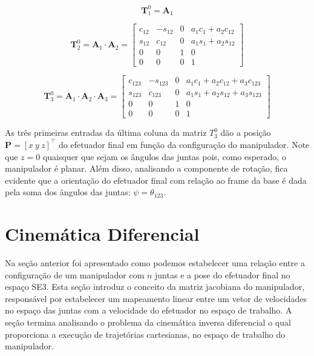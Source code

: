 \begin{equation}
    \mathbf{T}^0_1 = \mathbf{A}_1
\end{equation}

\begin{equation}
    \mathbf{T}^0_2 = \mathbf{A}_1 \cdot \mathbf{A}_2 = \begin{bmatrix}
        c_{12} & -s_{12} & 0 & a_1c_1 + a_2c_{12} \\
        s_{12} & c_{12}  & 0 & a_1s_1 + a_2s_{12} \\
        0      & 0       & 1 & 0                  \\
        0      & 0       & 0 & 1
    \end{bmatrix}
\end{equation}

\begin{equation}
    \mathbf{T}^0_3 = \mathbf{A}_1 \cdot \mathbf{A}_2 \cdot \mathbf{A}_3 = \begin{bmatrix}
        c_{123} & -s_{123} & 0 & a_1c_1 + a_2c_{12} + a_3c_{123} \\
        s_{123} & c_{123}  & 0 & a_1s_1 + a_2s_{12} + a_3s_{123} \\
        0       & 0        & 1 & 0                               \\
        0       & 0        & 0 & 1
    \end{bmatrix}
\end{equation}

As três primeiras entradas da última coluna da matriz \(T^0_3\) dão a posição
\(\mathbf{P} = {\left[ x \ y \ z \right]}^{\top}\) do efetuador final em função
da configuração do manipulador. Note que $z = 0$ quaisquer que sejam os ângulos
das juntas pois, como esperado, o manipulador é planar. Além disso, analisando
a componente de rotação, fica evidente que a orientação do efetuador final com
relação ao frame da base é dada pela soma dos ângulos das juntas: $\psi =
    \theta_{123}$.

\section{Cinemática Diferencial}

Na seção anterior foi apresentado como podemos estabelecer uma relação entre a
configuração de um manipulador com $n$ juntas e a pose do efetuador final no
espaço SE3. Esta seção introduz o conceito da matriz jacobiana do manipulador,
responsável por estabelecer um mapeamento linear entre um vetor de velocidades no espaço
 das juntas com a velocidade do efetuador no espaço de trabalho. A seção termina analisando o 
problema da cinemática inversa diferencial o qual proporciona a execução de trajetórias 
cartesianas, no espaço de trabalho do manipulador.

